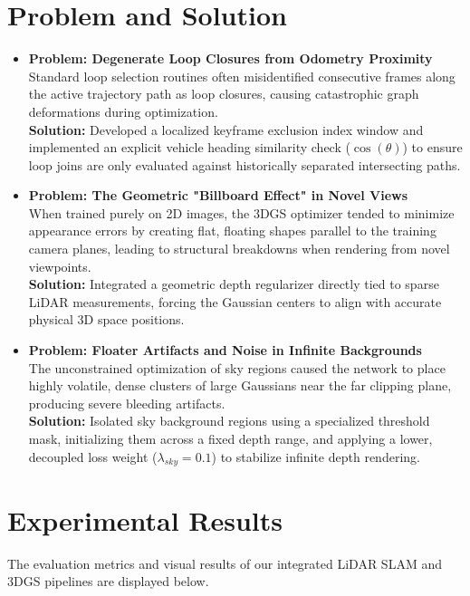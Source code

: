 \documentclass{article}
\begin{document}
\section{Problem and Solution}
\begin{itemize}
    \item \textbf{Problem: Degenerate Loop Closures from Odometry Proximity} \\
    Standard loop selection routines often misidentified consecutive frames along the active trajectory path as loop closures, causing catastrophic graph deformations during optimization. \\
    \textbf{Solution:} Developed a localized keyframe exclusion index window and implemented an explicit vehicle heading similarity check ($\cos(\theta)$) to ensure loop joins are only evaluated against historically separated intersecting paths.

    \item \textbf{Problem: The Geometric "Billboard Effect" in Novel Views} \\
    When trained purely on 2D images, the 3DGS optimizer tended to minimize appearance errors by creating flat, floating shapes parallel to the training camera planes, leading to structural breakdowns when rendering from novel viewpoints. \\
    \textbf{Solution:} Integrated a geometric depth regularizer directly tied to sparse LiDAR measurements, forcing the Gaussian centers to align with accurate physical 3D space positions.

    \item \textbf{Problem: Floater Artifacts and Noise in Infinite Backgrounds} \\
    The unconstrained optimization of sky regions caused the network to place highly volatile, dense clusters of large Gaussians near the far clipping plane, producing severe bleeding artifacts. \\
    \textbf{Solution:} Isolated sky background regions using a specialized threshold mask, initializing them across a fixed depth range, and applying a lower, decoupled loss weight ($\lambda_{sky} = 0.1$) to stabilize infinite depth rendering.
\end{itemize}

\section{Experimental Results}
The evaluation metrics and visual results of our integrated LiDAR SLAM and 3DGS pipelines are displayed below.
\end{document}
